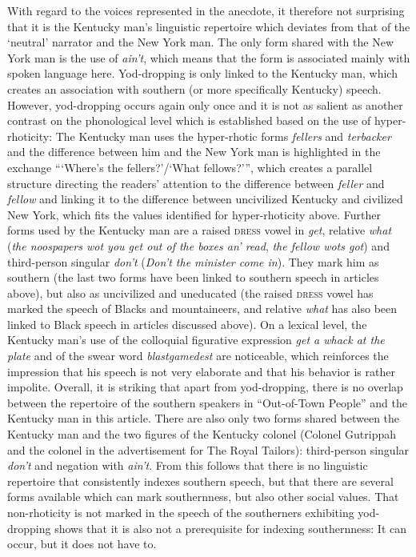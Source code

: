 With regard to the voices represented in the anecdote, it therefore not surprising that it is the Kentucky man’s linguistic repertoire which deviates from that of the ‘neutral’ narrator and the New York man. The only form shared with the New York man is the use of \emph{ain’t}, which means that the form is associated mainly with spoken language here. Yod-dropping is only linked to the Kentucky man, which creates an association with southern (or more specifically Kentucky) speech. However, yod-dropping occurs again only once and it is not as salient as another contrast on the phonological level which is established based on the use of hyper-rhoticity: The Kentucky man uses the hyper-rhotic forms \emph{fellers} and \emph{terbacker} and the difference between him and the New York man is highlighted in the exchange “‘Where’s the fellers?’/‘What fellows?’”, which creates a parallel structure directing the readers’ attention to the difference between \emph{feller} and \emph{fellow} and linking it to the difference between uncivilized Kentucky and civilized New York, which fits the values identified for hyper-rhoticity above. Further forms used by the Kentucky man are a raised \textsc{dress} vowel in \emph{get}, relative \emph{what} (\emph{the noospapers wot you get out of the boxes an’ read}, \emph{the fellow wots got}) and third-person singular \emph{don’t} (\emph{Don’t the minister come in}). They mark him as southern (the last two forms have been linked to southern speech in articles above), but also as uncivilized and uneducated (the raised \textsc{dress} vowel has marked the speech of Blacks and mountaineers, and relative \emph{what} has also been linked to Black speech in articles discussed above). On a lexical level, the Kentucky man’s use of the colloquial figurative expression \emph{get a whack at the plate} and of the swear word \emph{blastgamedest} are noticeable, which reinforces the impression that his speech is not very elaborate and that his behavior is rather impolite. Overall, it is striking that apart from yod-dropping, there is no overlap between the repertoire of the southern speakers in “Out-of-Town People” and the Kentucky man in this article. There are also only two forms shared between the Kentucky man and the two figures of the Kentucky colonel (Colonel Gutrippah and the colonel in the advertisement for The Royal Tailors): third-person singular \emph{don’t} and negation with \emph{ain’t}. From this follows that there is no linguistic repertoire that consistently indexes southern speech, but that there are several forms available which can mark southernness, but also other social values. That non-rhoticity is not marked in the speech of the southerners exhibiting yod-dropping shows that it is also not a prerequisite for indexing southernness: It can occur, but it does not have to.

